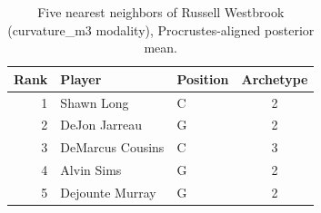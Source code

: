 \begin{table}[htbp]
  \centering\small
  \begin{tabular}{rllc}
    \toprule
    Rank & Player & Position & Archetype \\
    \midrule
    1 & Shawn Long & C & 2 \\
    2 & DeJon Jarreau & G & 2 \\
    3 & DeMarcus Cousins & C & 3 \\
    4 & Alvin Sims & G & 2 \\
    5 & Dejounte Murray & G & 2 \\
    \bottomrule
  \end{tabular}
  \caption{Five nearest neighbors of Russell Westbrook (curvature_m3 modality), Procrustes-aligned posterior mean.}
  \label{tab:Russell_Westbrook_neighbors_curvature_m3}
\end{table}

